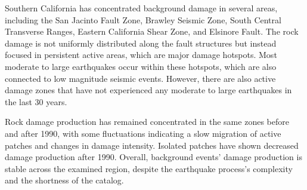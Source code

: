 \documentclass[12pt]{article} %
\theoremstyle{plain}
\begin{document}
	
	Southern California has concentrated background damage in several areas, including the San Jacinto Fault Zone, Brawley Seismic Zone, South Central Transverse Ranges, Eastern California Shear Zone, and Elsinore Fault. The rock damage is not uniformly distributed along the fault structures but instead focused in persistent active areas, which are major damage hotspots. Most moderate to large earthquakes occur within these hotspots, which are also connected to low magnitude seismic events. However, there are also active damage zones that have not experienced any moderate to large earthquakes in the last 30 years.
	
	Rock damage production has remained concentrated in the same zones before and after 1990, with some fluctuations indicating a slow migration of active patches and changes in damage intensity. Isolated patches have shown decreased damage production after 1990. Overall, background events' damage production is stable across the examined region, despite the earthquake process's complexity and the shortness of the catalog.
	
\end{document}
